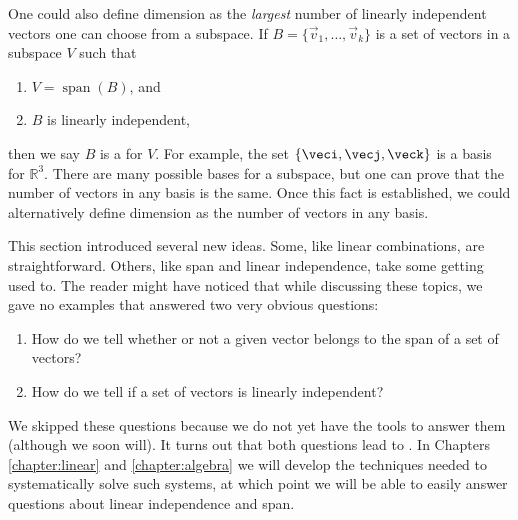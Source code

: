\smallskip


\smallskip

One could also define dimension as the \textit{largest} number of linearly independent vectors one can choose from a subspace. If $B=\{\vec{v}_1, \ldots, \vec{v}_k\}$ is a set of vectors in a subspace $V$ such that 
\begin{enumerate}
\item $V=\operatorname{span}(B)$, and
\item $B$ is linearly independent,
\end{enumerate}
then we say $B$ is a  for $V$. For example, the set $\{\veci, \vecj, \veck\}$ is a basis for $\mathbb{R}^3$. There are many possible bases for a subspace, but one can prove that the number of vectors in any basis is the same. Once this fact is established, we could alternatively define dimension as the number of vectors in any basis.

\medskip

This section introduced several new ideas. Some, like linear combinations, are straightforward. Others, like span and linear independence, take some getting used to. The reader might have noticed that while discussing these topics, we gave no examples that answered two very obvious questions:
\begin{enumerate}
\item How do we tell whether or not a given vector belongs to the span of a set of vectors?
\item How do we tell if a set of vectors is linearly independent?
\end{enumerate}
We skipped these questions because we do not yet have the tools to answer them (although we soon will). It turns out that both questions lead to . In Chapters \ref{chapter:linear} and \ref{chapter:algebra} we will develop the techniques needed to systematically solve such systems, at which point we will be able to easily answer questions about linear independence and span.

